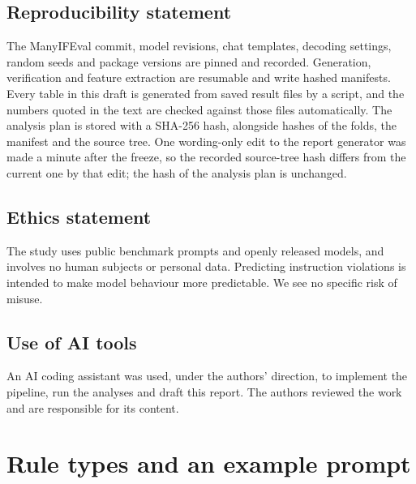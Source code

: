 \documentclass[10pt]{article}
\begin{document}
\subsection*{Reproducibility statement}
The ManyIFEval commit, model revisions, chat templates, decoding settings, random seeds and package versions are pinned
and recorded. Generation, verification and feature extraction are resumable and write hashed manifests. Every table in this draft is generated from saved result files by a script, and the numbers quoted in the text are
checked against those files automatically. The analysis
plan is stored with a SHA-256 hash, alongside hashes of the folds, the manifest and the source tree. One wording-only
edit to the report generator was made a minute after the freeze, so the recorded source-tree hash differs from the
current one by that edit; the hash of the analysis plan is unchanged.

\subsection*{Ethics statement}
The study uses public benchmark prompts and openly released models, and involves no human subjects or personal data.
Predicting instruction violations is intended to make model behaviour more predictable. We see no specific risk of
misuse.

\subsection*{Use of AI tools}
An AI coding assistant was used, under the authors' direction, to implement the pipeline, run the analyses and draft
this report. The authors reviewed the work and are responsible for its content.




\clearpage
\appendix

\section{Rule types and an example prompt}
\label{app:types}

\begin{table}[H]
\centering\footnotesize
\caption{The 15 rule types: category, the parameters drawn by the released code's default generators (``relation'' is
``less than'' or ``at least''), the number of training and test groups whose pool contains the type, and the violation
rate on the training groups with a 95\% interval.}
\label{tab:types}
\setlength{\tabcolsep}{4pt}

\end{table}
\end{document}
